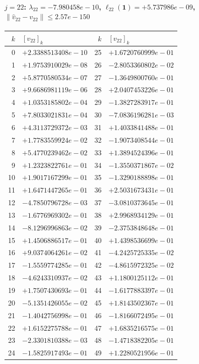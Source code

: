 \documentclass[11pt]{article}
\begin{document}
\paragraph{$j = 22$: $\lambda_{22} = -7.980458e-10$, \quad $\ell_{22}(\mathbf{1}) = +5.737986e-09$, \quad $\|\hat v_{22} - v_{22}\| \leq 2.57e-150$}
\begin{center}
{\footnotesize
\begin{tabular}{r@{\;\;}l@{\quad}r@{\;\;}l}
\toprule
$k$ & $[v_{22}]_k$ & $k$ & $[v_{22}]_k$ \\
\midrule
0 & $+2.3388513408e-10$ & 25 & $+1.6720760999e-01$ \\
1 & $+1.9753910029e-08$ & 26 & $-2.8053360802e-02$ \\
2 & $+5.8770580534e-07$ & 27 & $-1.3649800760e-01$ \\
3 & $+9.6686981119e-06$ & 28 & $+2.0407453226e-01$ \\
4 & $+1.0353185802e-04$ & 29 & $-1.3827283917e-01$ \\
5 & $+7.8033021831e-04$ & 30 & $-7.0836196281e-03$ \\
6 & $+4.3113729372e-03$ & 31 & $+1.4033841488e-01$ \\
7 & $+1.7783559924e-02$ & 32 & $-1.9073408544e-01$ \\
8 & $+5.4770239462e-02$ & 33 & $+1.3894524396e-01$ \\
9 & $+1.2323822761e-01$ & 34 & $-1.3550371867e-02$ \\
10 & $+1.9017167299e-01$ & 35 & $-1.3290188898e-01$ \\
11 & $+1.6471447265e-01$ & 36 & $+2.5031673431e-01$ \\
12 & $-4.7850796728e-03$ & 37 & $-3.0810373645e-01$ \\
13 & $-1.6776969302e-01$ & 38 & $+2.9968934129e-01$ \\
14 & $-8.1296996863e-02$ & 39 & $-2.3753848648e-01$ \\
15 & $+1.4506886517e-01$ & 40 & $+1.4398536699e-01$ \\
16 & $+9.0374064261e-02$ & 41 & $-4.2425725335e-02$ \\
17 & $-1.5559774285e-01$ & 42 & $-4.8615972325e-02$ \\
18 & $-4.6243310937e-02$ & 43 & $+1.1800125112e-01$ \\
19 & $+1.7507430693e-01$ & 44 & $-1.6177883397e-01$ \\
20 & $-5.1351426055e-02$ & 45 & $+1.8143502367e-01$ \\
21 & $-1.4042756998e-01$ & 46 & $-1.8166072495e-01$ \\
22 & $+1.6152275788e-01$ & 47 & $+1.6835216575e-01$ \\
23 & $-2.3301810388e-03$ & 48 & $-1.4718382205e-01$ \\
24 & $-1.5825917493e-01$ & 49 & $+1.2280521956e-01$ \\
\bottomrule
\end{tabular}
}
\end{center}
\end{document}
